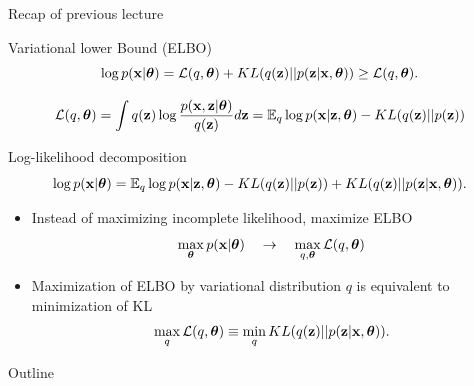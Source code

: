 \begin{frame}{Recap of previous lecture}
	\begin{block}{Variational lower Bound (ELBO)}
		\vspace{-0.3cm}
		\[
			\log p(\mathbf{x}| \boldsymbol{\theta}) = \mathcal{L} (q, \boldsymbol{\theta}) + KL(q(\mathbf{z}) || p(\mathbf{z}|\mathbf{x}, \boldsymbol{\theta})) \geq \mathcal{L} (q, \boldsymbol{\theta}).
		\]
	\end{block}
	
	\vspace{-0.5cm}
	\[
	 \mathcal{L} (q, \boldsymbol{\theta}) = \int q(\mathbf{z}) \log \frac{p(\mathbf{x}, \mathbf{z} | \boldsymbol{\theta})}{q(\mathbf{z})}d\mathbf{z} = \mathbb{E}_{q} \log p(\mathbf{x} | \mathbf{z}, \boldsymbol{\theta}) - KL (q(\mathbf{z}) || p(\mathbf{z}))
	\]
	\vspace{-0.3cm}
	\begin{block}{Log-likelihood decomposition}
		\vspace{-0.5cm}
		\[
		 \log p(\mathbf{x}| \boldsymbol{\theta}) = \mathbb{E}_{q} \log p(\mathbf{x} | \mathbf{z}, \boldsymbol{\theta}) - KL (q(\mathbf{z}) || p(\mathbf{z})) + KL(q(\mathbf{z}) || p(\mathbf{z}|\mathbf{x}, \boldsymbol{\theta})).
		\]
	\end{block}
	\begin{itemize}
	\item Instead of maximizing incomplete likelihood, maximize ELBO
   	\[
  \max_{\boldsymbol{\theta}} p(\mathbf{x} | \boldsymbol{\theta}) \quad \rightarrow \quad \max_{q, \boldsymbol{\theta}} \mathcal{L} (q, \boldsymbol{\theta})
   	\]
   	\item Maximization of ELBO by variational distribution $q$ is equivalent to minimization of KL
  	\[
  \max_q \mathcal{L} (q, \boldsymbol{\theta}) \equiv \min_q KL(q(\mathbf{z}) || p(\mathbf{z}|\mathbf{x}, \boldsymbol{\theta})).
  	\]
  	\end{itemize}
		   	    
\end{frame}
\begin{frame}{Outline}
	\tableofcontents
\end{frame}

